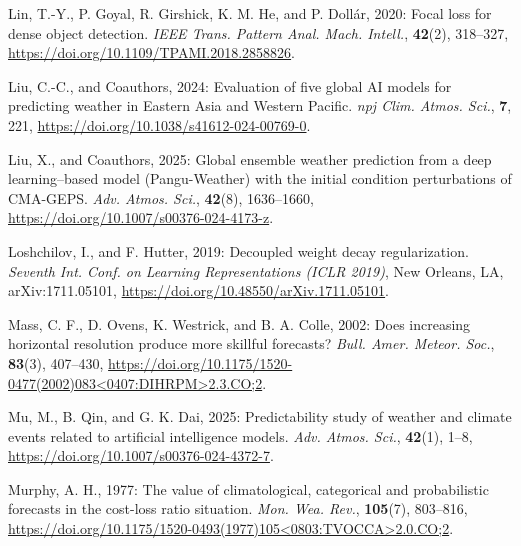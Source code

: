 \documentclass[12pt]{article}
\begin{document}
\begin{Exercises}
\item\hspace*{-6mm}
Lin, T.-Y., P. Goyal, R. Girshick, K. M. He, and P. Doll\'ar, 2020: Focal loss for dense object detection. \textit{IEEE Trans. Pattern Anal. Mach. Intell.}, \textbf{42}(2), 318--327, \url{https://doi.org/10.1109/TPAMI.2018.2858826}.

\item\hspace*{-6mm}
Liu, C.-C., and Coauthors, 2024: Evaluation of five global AI models for predicting weather in Eastern Asia and Western Pacific. \textit{npj Clim. Atmos. Sci.}, \textbf{7}, 221, \url{https://doi.org/10.1038/s41612-024-00769-0}.

\item\hspace*{-6mm}
Liu, X., and Coauthors, 2025: Global ensemble weather prediction from a deep learning--based model (Pangu-Weather) with the initial condition perturbations of CMA-GEPS. \textit{Adv. Atmos. Sci.}, \textbf{42}(8), 1636--1660, \url{https://doi.org/10.1007/s00376-024-4173-z}.

\item\hspace*{-6mm}
Loshchilov, I., and F. Hutter, 2019: Decoupled weight decay regularization. \textit{Seventh Int. Conf. on Learning Representations (ICLR 2019)}, New Orleans, LA, arXiv:1711.05101, \url{https://doi.org/10.48550/arXiv.1711.05101}.

\item\hspace*{-6mm}
Mass, C. F., D. Ovens, K. Westrick, and B. A. Colle, 2002: Does increasing horizontal resolution produce more skillful forecasts? \textit{Bull. Amer. Meteor. Soc.}, \textbf{83}(3), 407--430, \url{https://doi.org/10.1175/1520-0477(2002)083<0407:DIHRPM>2.3.CO;2}.

\item\hspace*{-6mm}
Mu, M., B. Qin, and G. K. Dai, 2025: Predictability study of weather and climate events related to artificial intelligence models. \textit{Adv. Atmos. Sci.}, \textbf{42}(1), 1--8, \url{https://doi.org/10.1007/s00376-024-4372-7}.

\item\hspace*{-6mm}
Murphy, A. H., 1977: The value of climatological, categorical and probabilistic forecasts in the cost-loss ratio situation. \textit{Mon. Wea. Rev.}, \textbf{105}(7), 803--816, \url{https://doi.org/10.1175/1520-0493(1977)105<0803:TVOCCA>2.0.CO;2}.


\end{Exercises}
\end{document}
